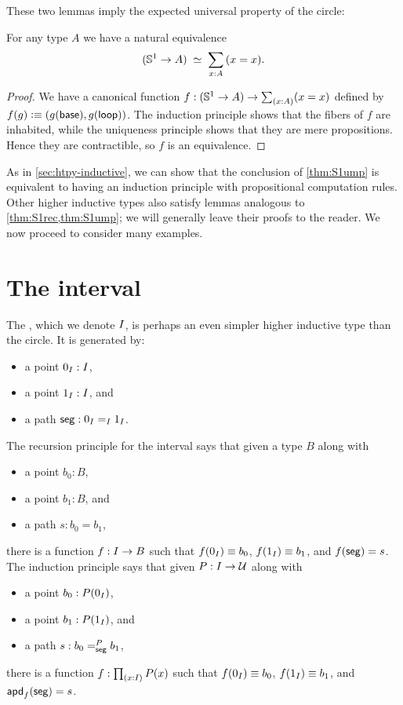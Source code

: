 %
These two lemmas imply the expected universal property of the circle:

\begin{lem}\label{thm:S1ump}
  For any type $A$ we have a natural equivalence
  \[ (\Sn^1 \to A) \;\eqvsym\;
  \sm{x:A} (x=x).
  \]
\end{lem}
\begin{proof}
  We have a canonical function $f:(\Sn^1 \to A) \to \sm{x:A} (x=x)$ defined by $f(g) \defeq (g(\base),\ap g \lloop)$.
  The induction principle shows that the fibers of $f$ are inhabited, while the uniqueness principle shows that they are mere propositions.
  Hence they are contractible, so $f$ is an equivalence.
\end{proof}

%

As in \cref{sec:htpy-inductive}, we can show that the conclusion of \cref{thm:S1ump} is equivalent to having an induction principle with propositional computation rules.
Other higher inductive types also satisfy lemmas analogous to \cref{thm:S1rec,thm:S1ump}; we will generally leave their proofs to the reader.
We now proceed to consider many examples.


\section{The interval}
\label{sec:interval}

%
%
The , which we denote $\interval$, is perhaps an even simpler higher inductive type than the circle.
It is generated by:
\begin{itemize}
\item a point $\izero:\interval$,
\item a point $\ione:\interval$, and
\item a path $\seg : \id[\interval]\izero\ione$.
\end{itemize}
%
The recursion principle for the interval says that given a type $B$ along with
\begin{itemize}
\item a point $b_0:B$,
\item a point $b_1:B$, and
\item a path $s:b_0=b_1$,
\end{itemize}
there is a function $f:\interval\to B$ such that $f(\izero)\jdeq b_0$, $f(\ione)\jdeq b_1$, and $\ap f \seg = s$.
%
The induction principle says that given $P:\interval\to\type$ along with
\begin{itemize}
\item a point $b_0:P(\izero)$,
\item a point $b_1:P(\ione)$, and
\item a path $s:\dpath{P}{\seg}{b_0}{b_1}$,
\end{itemize}
there is a function $f:\prd{x:\interval} P(x)$ such that $f(\izero)\jdeq b_0$, $f(\ione)\jdeq b_1$, and $\apd f \seg = s$.

